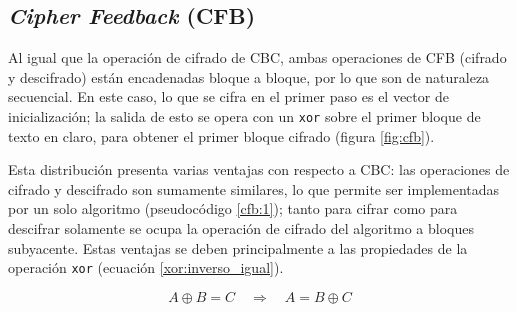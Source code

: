 %
%

\subsection{\textit{Cipher Feedback} (CFB)}

Al igual que la operación de cifrado de CBC, ambas operaciones de CFB (cifrado
y descifrado) están encadenadas bloque a bloque, por lo que son de naturaleza
secuencial. En este caso, lo que se cifra en el primer paso es el vector de
inicialización; la salida de esto se opera con un \verb|xor| sobre el primer
bloque de texto en claro, para obtener el primer bloque cifrado (figura
\ref{fig:cfb}).

Esta distribución presenta varias ventajas con respecto a CBC: las operaciones
de cifrado y descifrado son sumamente similares, lo que permite ser
implementadas por un solo algoritmo (pseudocódigo \ref{cfb:1}); tanto para
cifrar como para descifrar solamente se ocupa la operación de cifrado del
algoritmo a bloques subyacente. Estas ventajas se deben principalmente a las
propiedades de la operación \verb|xor| (ecuación \ref{xor:inverso_igual}).

\begin{equation}
  \label{xor:inverso_igual}
  A \oplus B = C \quad \Rightarrow \quad A = B \oplus C
\end{equation}

